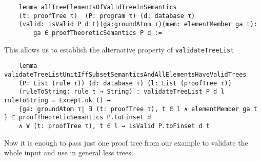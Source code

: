 \begin{lstlisting}
    lemma allTreeElementsOfValidTreeInSemantics 
    (t: proofTree τ)  (P: program τ) (d: database τ) 
    (valid: isValid P d t)(ga:groundAtom τ)(mem: elementMember ga t):
        ga ∈ proofTheoreticSemantics P d :=
\end{lstlisting}

This allows us to establish the alternative property of \texttt{validateTreeList}

\begin{lstlisting}
    lemma validateTreeListUnitIffSubsetSemanticsAndAllElementsHaveValidTrees 
    (P: List (rule τ)) (d: database τ) (l: List (proofTree τ)) 
    (ruleToString: rule τ → String) : validateTreeList P d l  ruleToString = Except.ok () ↔
    {ga: groundAtom τ| ∃ (t: proofTree τ), t ∈ l ∧ elementMember ga t } ⊆ proofTheoreticSemantics P.toFinset d 
    ∧ ∀ (t: proofTree τ), t ∈ l → isValid P.toFinset d t
\end{lstlisting}

Now it is enough to pass just one proof tree from our example to validate the whole input and use in general less trees. 
